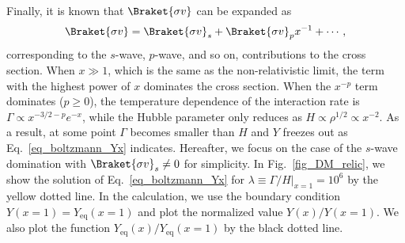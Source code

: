 \documentclass[12pt,twoside,book]{article}
\begin{document}
Finally, it is known that $\Braket{\sigma v}$ can be expanded as~\cite{Gondolo:1990dk}
\begin{align}
  \Braket{\sigma v} = \Braket{\sigma v}_s +
  \Braket{\sigma v}_p x^{-1} + \cdots,
\end{align}
corresponding to the $s$-wave, $p$-wave, and so on, contributions to the cross section.
When $x \gg 1$, which is the same as the non-relativistic limit, the term with the highest power of $x$ dominates the cross section.  When the $x^{-p}$ term dominates ($p \geq 0$), the temperature dependence of the interaction rate is $\Gamma \propto x^{-3/2-p} e^{-x}$, while the Hubble parameter only reduces as $H \propto \rho^{1/2} \propto x^{-2}$.
As a result, at some point $\Gamma$ becomes smaller than $H$ and $Y$ freezes out as Eq.~\eqref{eq_boltzmann_Yx} indicates.
Hereafter, we focus on the case of the $s$-wave domination with $\Braket{\sigma v}_s \neq 0$ for simplicity.
In Fig.~\ref{fig_DM_relic}, we show the solution of Eq.~\eqref{eq_boltzmann_Yx} for $\lambda \equiv \left. \Gamma / H \right|_{x=1} = 10^6$ by the yellow dotted line.
In the calculation, we use the boundary condition $Y(x=1) = Y_{\mathrm{eq}} (x=1)$ and plot the normalized value $Y(x) / Y(x=1)$.  We also plot the function $Y_{\mathrm{eq}} (x) / Y_{\mathrm{eq}} (x=1)$ by the black dotted line.
\end{document}

